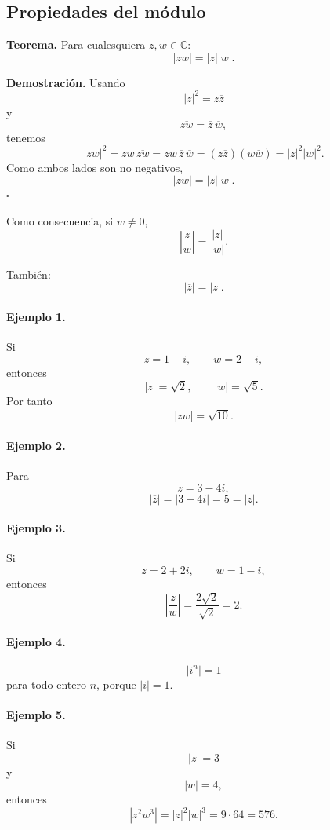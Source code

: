 \subsection{Propiedades del módulo}

\textbf{Teorema.}
Para cualesquiera $z,w\in\mathbb{C}$:
\[
\boxed{|zw|=|z||w|.}
\]

\textbf{Demostración.}
Usando
\[
|z|^2=z\overline z
\]
y
\[
\overline{zw}=\overline z\,\overline w,
\]
tenemos
\[
|zw|^2
=
zw\,\overline{zw}
=
zw\,\overline z\,\overline w
=
(z\overline z)(w\overline w)
=
|z|^2|w|^2.
\]
Como ambos lados son no negativos,
\[
|zw|=|z||w|.
\]
\hfill$\square$

Como consecuencia, si $w\neq0$,
\[
\boxed{
\left|\frac zw\right|
=
\frac{|z|}{|w|}.
}
\]

También:
\[
\boxed{|\overline z|=|z|.}
\]

\paragraph{Ejemplo 1.}
Si
\[
z=1+i,
\qquad
w=2-i,
\]
entonces
\[
|z|=\sqrt2,
\qquad
|w|=\sqrt5.
\]
Por tanto
\[
|zw|=\sqrt{10}.
\]

\paragraph{Ejemplo 2.}
Para
\[
z=3-4i,
\]
\[
|\overline z|
=
|3+4i|
=
5
=
|z|.
\]

\paragraph{Ejemplo 3.}
Si
\[
z=2+2i,
\qquad
w=1-i,
\]
entonces
\[
\left|\frac zw\right|
=
\frac{2\sqrt2}{\sqrt2}
=
2.
\]

\paragraph{Ejemplo 4.}
\[
|i^n|=1
\]
para todo entero $n$, porque $|i|=1$.

\paragraph{Ejemplo 5.}
Si
\[
|z|=3
\]
y
\[
|w|=4,
\]
entonces
\[
|z^2w^3|
=
|z|^2|w|^3
=
9\cdot64
=
576.
\]

